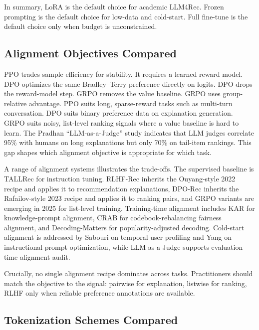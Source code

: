 \documentclass{article}
\begin{document}
In summary, LoRA is the default choice for academic LLM4Rec. Frozen prompting is the default choice for low-data and cold-start. Full fine-tune is the default choice only when budget is unconstrained.

\subsection{Alignment Objectives Compared}\label{alignment-objectives-compared}

PPO trades sample efficiency for stability. It requires a learned reward model. DPO optimizes the same Bradley--Terry preference directly on logits. DPO drops the reward-model step. GRPO removes the value baseline. GRPO uses group-relative advantage. PPO suits long, sparse-reward tasks such as multi-turn conversation. DPO suits binary preference data on explanation generation. GRPO suits noisy, list-level ranking signals where a value baseline is hard to learn. The Pradhan \citet{pradhan2025llmasajudgerapidev} ``LLM-as-a-Judge'' study indicates that LLM judges correlate 95\% with humans on long explanations but only 70\% on tail-item rankings. This gap shapes which alignment objective is appropriate for which task.

A range of alignment systems illustrates the trade-offs. The supervised baseline is TALLRec \citep{bao2023arxiv2305004472023} for instruction tuning. RLHF-Rec inherits the Ouyang-style 2022 recipe and applies it to recommendation explanations, DPO-Rec inherits the Rafailov-style 2023 recipe and applies it to ranking pairs, and GRPO variants are emerging in 2025 for list-level training. Training-time alignment includes KAR \citep{xi2024towardsopenworldre} for knowledge-prompt alignment, CRAB \citep{fan2026crabcodebookrebala} for codebook-rebalancing fairness alignment, and Decoding-Matters \citep{bao2024decodingmattersadd} for popularity-adjusted decoding. Cold-start alignment is addressed by Sabouri \citet{sabouri2025effectivenessofllm} on temporal user profiling and Yang \citet{yang2025instructionalpromp} on instructional prompt optimization, while LLM-as-a-Judge \citep{pradhan2025llmasajudgerapidev} supports evaluation-time alignment audit.

Crucially, no single alignment recipe dominates across tasks. Practitioners should match the objective to the signal: pairwise for explanation, listwise for ranking, RLHF only when reliable preference annotations are available.

\subsection{Tokenization Schemes Compared}\label{tokenization-schemes-compared}
\end{document}
